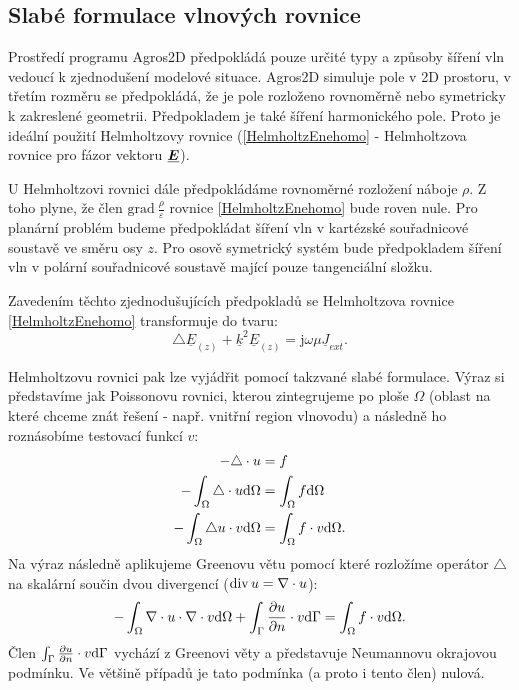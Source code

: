 \documentclass[12pt,a4paper,oneside]{article}
\numberwithin{equation}{section} %
\numberwithin{figure}{section} %
\numberwithin{table}{section} %
\newcommand{\mj}{\mathrm{j}} %
\renewcommand{\vec}[1]{\mbox{\boldmath$#1$}} %
\newcommand{\faz}[1]{{\underline{#1}}} %
\newcommand{\grad}{\mathrm{grad}\ }
\begin{document}
\subsection{Slabé formulace vlnových rovnice}
Prostředí programu Agros2D předpokládá pouze určité typy a způsoby šíření vln vedoucí k zjednodušení modelové situace. Agros2D simuluje pole v 2D prostoru, v třetím rozměru se předpokládá, že je pole rozloženo rovnoměrně nebo symetricky k zakreslené geometrii. Předpokladem je také šíření harmonického pole. Proto je ideální použití Helmholtzovy rovnice (\ref{HelmholtzEnehomo} - Helmholtzova rovnice pro fázor vektoru $\faz{\vec{E}}$).

U Helmholtzovi rovnici dále předpokládáme rovnoměrné rozložení náboje $\rho$. Z toho plyne, že člen $\grad \frac{\rho}{\varepsilon}$ rovnice \ref{HelmholtzEnehomo} bude roven nule. Pro planární problém budeme předpokládat šíření vln v kartézské souřadnicové soustavě ve směru osy $z$. Pro osově symetrický systém bude předpokladem šíření vln v polární souřadnicové soustavě mající pouze tangenciální složku.

Zavedením těchto zjednodušujících předpokladů se Helmholtzova rovnice \ref{HelmholtzEnehomo} transformuje do tvaru:
\begin{equation}
\label{HelmEasy}
\triangle \faz{E} _{(z)} + \faz{k} ^2 \faz{E} _{(z)} = \mj \omega \mu \faz{J} _{ext} .
\end{equation}

Helmholtzovu rovnici pak lze vyjádřit pomocí takzvané slabé formulace. Výraz si představíme jak Poissonovu rovnici, kterou zintegrujeme po ploše $\Omega$ (oblast na které chceme znát řešení - např. vnitřní region vlnovodu) a následně ho roznásobíme testovací funkcí $v$:
\begin{subequations}
\label{Poisson}
\begin{align}
- \triangle \cdot u &= f
\\
- \int _{\Omega} \triangle \cdot u \mathrm{d} \Omega &= \int _{\Omega} f \mathrm{d} \Omega
\\
- \int _{\Omega} \triangle u \cdot v \mathrm{d} \Omega &= \int _{\Omega} f \cdot v \mathrm{d} \Omega .
\end{align}
\end{subequations}
Na výraz následně aplikujeme Greenovu větu pomocí které rozložíme operátor $\triangle$ na skalární součin dvou divergencí ($\mathop{\rm div}\nolimits u = \nabla \cdot u$):
\begin{equation}
\label{Green}
- \int _{\Omega} \nabla \cdot u \cdot \nabla \cdot v \mathrm{d} \Omega + \int _{\Gamma} \frac{\partial u}{\partial n} \cdot v \mathrm{d} \Gamma = \int _{\Omega} f \cdot v \mathrm{d} \Omega .
\end{equation}
Člen $\int _{\Gamma} \frac{\partial u}{\partial n} \cdot v \mathrm{d} \Gamma$ vychází z Greenovi věty a představuje Neumannovu okrajovou podmínku. Ve většině případů je tato podmínka (a proto i tento člen) nulová.
\end{document}
